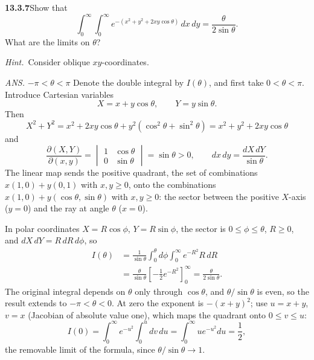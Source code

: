 \par\bigskip
\noindent\textbf{13.3.7}\quad Show that
\[
\int_{0}^{\infty}\!\!\int_{0}^{\infty}
e^{-(x^{2}+y^{2}+2xy\cos\theta)}\,dx\,dy=\frac{\theta}{2\sin\theta}.
\]
What are the limits on $\theta$?

\emph{Hint.}~Consider oblique $xy$-coordinates.
\par\nobreak\hfill\emph{ANS.}\enspace
$-\pi<\theta<\pi$ 
\solution
Denote the double integral by $I(\theta)$, and first take
$0<\theta<\pi$.  Introduce Cartesian variables
\[
X=x+y\cos\theta,\qquad Y=y\sin\theta.
\]
Then
\[
X^2+Y^2=x^2+2xy\cos\theta+y^2(\cos^2\theta+\sin^2\theta)
=x^2+y^2+2xy\cos\theta
\]
and
\[
\frac{\partial(X,Y)}{\partial(x,y)}
=\begin{vmatrix}1&\cos\theta\\0&\sin\theta\end{vmatrix}
=\sin\theta>0,
\qquad dx\,dy=\frac{dX\,dY}{\sin\theta}.
\]
The linear map sends the positive quadrant, the set of
combinations $x(1,0)+y(0,1)$ with $x,y\ge0$, onto the
combinations $x(1,0)+y(\cos\theta,\sin\theta)$ with $x,y\ge0$:
the sector between the positive $X$-axis ($y=0$) and the ray at
angle $\theta$ ($x=0$).

\begin{center}
\end{center}
In polar coordinates $X=R\cos\phi$, $Y=R\sin\phi$, the sector
is $0\le\phi\le\theta$, $R\ge0$, and $dX\,dY=R\,dR\,d\phi$, so
\begin{align*}
I(\theta)&=\frac1{\sin\theta}
\int_0^\theta d\phi\int_0^\infty e^{-R^2}R\,dR\\
&=\frac\theta{\sin\theta}
\left[-\frac12e^{-R^2}\right]_0^\infty
=\boxed{\frac\theta{2\sin\theta}}.
\end{align*}
The original integral depends on $\theta$ only through
$\cos\theta$, and $\theta/\sin\theta$ is even, so the result
extends to $-\pi<\theta<0$.  At zero the exponent is
$-(x+y)^2$; use $u=x+y$, $v=x$ (Jacobian of absolute value one),
which maps the quadrant onto $0\le v\le u$:
\[
I(0)=\int_0^\infty e^{-u^2}\int_0^u dv\,du
=\int_0^\infty ue^{-u^2}du=\frac12,
\]
the removable limit of the formula, since
$\theta/\sin\theta\to1$.

